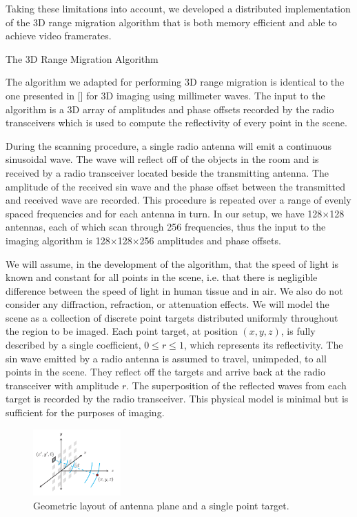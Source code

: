 \documentclass[twocolumn]{article}
\makeatletter
\def\section{\@startsection{section}{1}{\z@}{24pt plus 2 pt
minus 2 pt} {12pt plus 2pt minus 2pt}{\large\bf}}
\makeatother
\begin{document}
Taking these limitations into account, we developed a distributed implementation of the 3D range migration algorithm that is both memory efficient and able to achieve video framerates.

\section{The 3D Range Migration Algorithm}
\label{algorithm-section}

The algorithm we adapted for performing 3D range migration is identical to the one presented in [] for 3D imaging using millimeter waves. The input to the algorithm is a 3D array of amplitudes and phase offsets recorded by the radio transceivers which is used to compute the reflectivity of every point in the scene. 

During the scanning procedure, a single radio antenna will emit a continuous sinusoidal wave. The wave will reflect off of the objects in the room and is received by a radio transceiver located beside the transmitting antenna. The amplitude of the received sin wave and the phase offset between the transmitted and received wave are recorded. This procedure is repeated over a range of evenly spaced frequencies and for each antenna in turn. In our setup, we have 128$\times$128 antennas, each of which scan through 256 frequencies, thus the input to the imaging algorithm is 128$\times$128$\times$256 amplitudes and phase offsets.

We will assume, in the development of the algorithm, that the speed of light is known and constant for all points in the scene, i.e. that there is negligible difference between the speed of light in human tissue and in air. We also do not consider any diffraction, refraction, or attenuation effects. We will model the scene as a collection of discrete point targets distributed uniformly throughout the region to be imaged. Each point target, at position $(x,y,z)$, is fully described by a single coefficient, $0 \leq r \leq 1$, which represents its reflectivity. The sin wave emitted by a radio antenna is assumed to travel, unimpeded, to all points in the scene. They reflect off the targets and arrive back at the radio transceiver with amplitude $r$. The superposition of the reflected waves from each target is recorded by the radio transceiver. This physical model is minimal but is sufficient for the purposes of imaging.

\begin{figure}[!h]
\centering
\includegraphics*[width=0.3\textwidth]{figures/antenna.pdf}
\caption{Geometric layout of antenna plane and a single point target.}
\label{antenna}
\end{figure}
\end{document}
